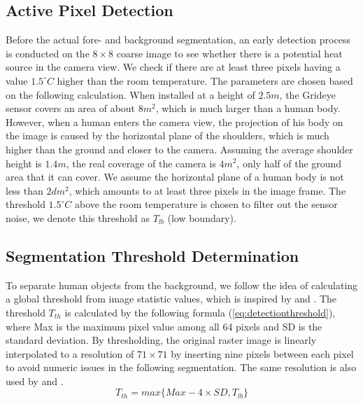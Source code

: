 \subsection{Active Pixel Detection}
Before the actual fore- and background segmentation, an early detection process is conducted on the $8\times8$ coarse image to see whether there is a potential heat source in the camera view. We check if there are at least three pixels having a value $1.5^\circ C$ higher than the room temperature. The parameters are chosen based on the following calculation. When installed at a height of $2.5m$, the Grideye sensor covers an area of about $8m^2$, which is much larger than a human body. However, when a human enters the camera view, the projection of his body on the image is caused by the horizontal plane of the shoulders, which is much higher than the ground and closer to the camera. Assuming the average shoulder height is $1.4m$, the real coverage of the camera is $4m^2$, only half of the ground area that it can cover. We assume the horizontal plane of a human body is not less than $2dm^2$, which amounts to at least three pixels in the image frame. The threshold $1.5^\circ C$ above the room temperature is chosen to filter out the sensor noise, we denote this threshold as $T_{lb}$ (low boundary).
\subsection{Segmentation Threshold Determination}
To separate human objects from the background, we follow the idea of calculating a global threshold from image statistic values, which is inspired by \cite{virtualtrack} and \cite{jeong2014probabilistic}. The threshold $T_{th}$ is calculated by the following formula (\autoref{eq:detectionthreshold}), where Max is the maximum pixel value among all 64 pixels and SD is the standard deviation. By thresholding, the original raster image is linearly interpolated to a resolution of $71\times71$ by inserting nine pixels between each pixel to avoid numeric issues in the following segmentation. The same resolution is also used by \cite{virtualtrack} and \cite{mika}.
\begin{equation}\label{eq:detectionthreshold}
  T_{th} = max\{Max - 4\times SD, T_{lb}\}
\end{equation}

